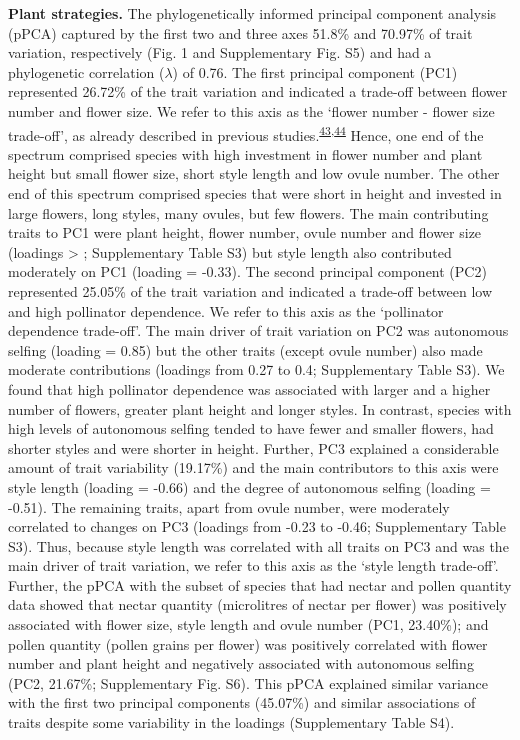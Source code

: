 \documentclass[
  12pt,
  a4paper,
]{article}
\begin{document}
\textbf{Plant strategies.} The phylogenetically informed principal component analysis (pPCA) captured by the first two and three axes 51.8\% and 70.97\% of trait variation, respectively (Fig. 1 and Supplementary Fig. S5) and had a phylogenetic correlation (\(\lambda\)) of 0.76. The first principal component (PC1) represented 26.72\% of the trait variation and indicated a trade-off between flower number and flower size. We refer to this axis as the `flower number - flower size trade-off', as already described in previous studies.\textsuperscript{\protect\hyperlink{ref-sargent2007}{43},\protect\hyperlink{ref-kettle2011}{44}} Hence, one end of the spectrum comprised species with high investment in flower number and plant height but small flower size, short style length and low ovule number. The other end of this spectrum comprised species that were short in height and invested in large flowers, long styles, many ovules, but few flowers. The main contributing traits to PC1 were plant height, flower number, ovule number and flower size (loadings \textgreater{} \textbar; Supplementary Table S3) but style length also contributed moderately on PC1 (loading = -0.33). The second principal component (PC2) represented 25.05\% of the trait variation and indicated a trade-off between low and high pollinator dependence. We refer to this axis as the `pollinator dependence trade-off'. The main driver of trait variation on PC2 was autonomous selfing (loading = 0.85) but the other traits (except ovule number) also made moderate contributions (loadings from 0.27 to 0.4; Supplementary Table S3). We found that high pollinator dependence was associated with larger and a higher number of flowers, greater plant height and longer styles. In contrast, species with high levels of autonomous selfing tended to have fewer and smaller flowers, had shorter styles and were shorter in height. Further, PC3 explained a considerable amount of trait variability (19.17\%) and the main contributors to this axis were style length (loading = -0.66) and the degree of autonomous selfing (loading = -0.51). The remaining traits, apart from ovule number, were moderately correlated to changes on PC3 (loadings from -0.23 to -0.46; Supplementary Table S3). Thus, because style length was correlated with all traits on PC3 and was the main driver of trait variation, we refer to this axis as the `style length trade-off'. Further, the pPCA with the subset of species that had nectar and pollen quantity data showed that nectar quantity (microlitres of nectar per flower) was positively associated with flower size, style length and ovule number (PC1, 23.40\%); and pollen quantity (pollen grains per flower) was positively correlated with flower number and plant height and negatively associated with autonomous selfing (PC2, 21.67\%; Supplementary Fig. S6). This pPCA explained similar variance with the first two principal components (45.07\%) and similar associations of traits despite some variability in the loadings (Supplementary Table S4).
\end{document}
